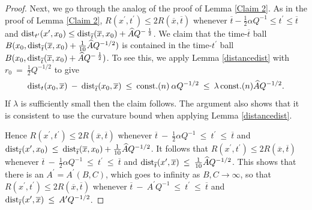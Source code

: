 \begin{proof}
Next, we go through the analog of the proof of Lemma \ref{Claim 2}.
As in the proof of Lemma \ref{Claim 2}, $R(x^\prime, t^\prime) \le 2
R(\overline{x}, \overline{t})$ whenever
$\overline{t}-\frac12 \alpha Q^{-1} \le t^\prime \le \overline{t}$
and $\operatorname{dist}_{t^\prime}(x^\prime, x_0) \le
\operatorname{dist}_{\overline{t}}(\overline{x}, x_0) + \widehat{A} Q^{- \: \frac12}$. We
claim that the time-$\overline{t}$ ball
$B(x_0, \operatorname{dist}_{\overline{t}}(\overline{x}, x_0) + \frac{1}{10} \widehat{A}
Q^{-1/2})$ is contained in the time-$t^\prime$ ball
$B(x_0, \operatorname{dist}_{\overline{t}}(\overline{x}, x_0) + \widehat{A} Q^{- \: \frac12})$.
To see this, we apply Lemma \ref{distancedist} with
$r_0 \: = \: \frac{1}{2} Q^{-1/2}$ to give
\begin{equation}
\operatorname{dist}_t(x_0, \overline{x}) \: - \:
\operatorname{dist}_{\overline{t}}(x_0, \overline{x}) \: \le \: \operatorname{const.}(n) \:
\alpha Q^{-1/2} \: \le \: \lambda \operatorname{const.}(n) \widehat{A} Q^{-1/2}.
\end{equation}
If $\lambda$ is sufficiently small then the claim follows. The argument
also shows that it is consistent to use the curvature bound when
applying Lemma \ref{distancedist}.

Hence $R(x^\prime, t^\prime) \le 2
R(\overline{x}, \overline{t})$ whenever
$\overline{t} \: - \: \frac{1}{2}  \alpha
Q^{-1} \: \le \: t^\prime \: \le \: \overline{t}$ and
$\operatorname{dist}_{\overline{t}}(x^\prime, x_0) \: \le \:
\operatorname{dist}_{\overline{t}}(\overline{x}, x_0) + \frac{1}{10} \widehat{A}
Q^{-1/2}$. It follows that
$R(x^\prime, t^\prime) \le 2
R(\overline{x}, \overline{t})$ whenever
$\overline{t} \: - \: \frac{1}{2}  \alpha
Q^{-1} \: \le \: t^\prime \: \le \: \overline{t}$ and
$\operatorname{dist}_{\overline{t}}(x^\prime, \overline{x}) \: \le \: \frac{1}{10}
\widehat{A} Q^{-1/2}$. This shows that there is an $A^\prime = A^\prime
(B, C)$, which goes
to infinity as $B, C \rightarrow \infty$, so that
$R(x^\prime, t^\prime) \le 2
R(\overline{x}, \overline{t})$ whenever
$\overline{t} \: - \: A^\prime
Q^{-1} \: \le \: t^\prime \: \le \: \overline{t}$ and
$\operatorname{dist}_{\overline{t}}(x^\prime, \overline{x}) \: \le \: A^\prime
Q^{-1/2}$.


\end{proof}
